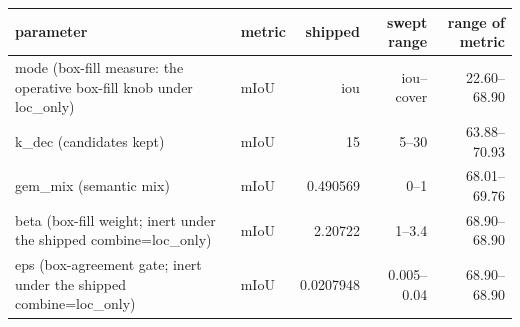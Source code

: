\begin{tabular}{llrrr}
\toprule
parameter & metric & shipped & swept range & range of metric \\
\midrule
mode (box-fill measure: the operative box-fill knob under loc\_only) & mIoU & iou & iou--cover & 22.60--68.90 \\
k\_dec (candidates kept) & mIoU & 15 & 5--30 & 63.88--70.93 \\
gem\_mix (semantic mix) & mIoU & 0.490569 & 0--1 & 68.01--69.76 \\
beta (box-fill weight; inert under the shipped combine=loc\_only) & mIoU & 2.20722 & 1--3.4 & 68.90--68.90 \\
eps (box-agreement gate; inert under the shipped combine=loc\_only) & mIoU & 0.0207948 & 0.005--0.04 & 68.90--68.90 \\
\bottomrule
\end{tabular}
